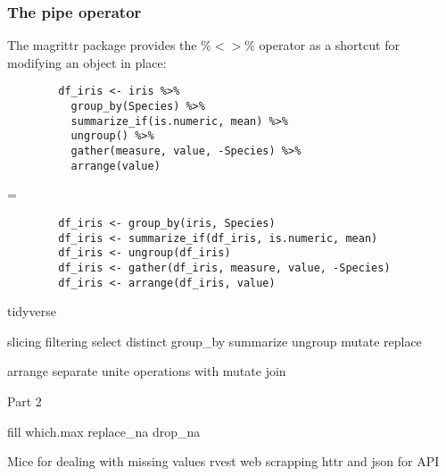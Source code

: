 \documentclass{beamer}
\begin{document}
	\begin{frame}[fragile]
		\frametitle{The pipe operator}

		The magrittr package provides the $\%<>\%$ operator as a shortcut for modifying an object in place:

		\vspace{1em}

		\begin{exampleblock}{}
		\begin{center}
		\begin{BVerbatim}
		df_iris <- iris %
		  group_by(Species) %
		  summarize_if(is.numeric, mean) %
		  ungroup() %
		  gather(measure, value, -Species) %
		  arrange(value)
		\end{BVerbatim}
		\end{center}
		\end{exampleblock}{}

		=

		\begin{exampleblock}{}
		\begin{center}
		\begin{BVerbatim}
		df_iris <- group_by(iris, Species)
		df_iris <- summarize_if(df_iris, is.numeric, mean)
		df_iris <- ungroup(df_iris)
		df_iris <- gather(df_iris, measure, value, -Species)
		df_iris <- arrange(df_iris, value)
		\end{BVerbatim}
		\end{center}
		\end{exampleblock}{}

	\end{frame}

	\begin{frame}
tidyverse

slicing
filtering
select
distinct
group_by summarize ungroup
mutate replace

arrange
separate unite
operations with mutate
join

	\end{frame}

	\begin{frame}
Part 2

fill which.max replace_na
drop_na

Mice for dealing with missing values
rvest web scrapping
httr and json for API

	\end{frame}
\end{document}

